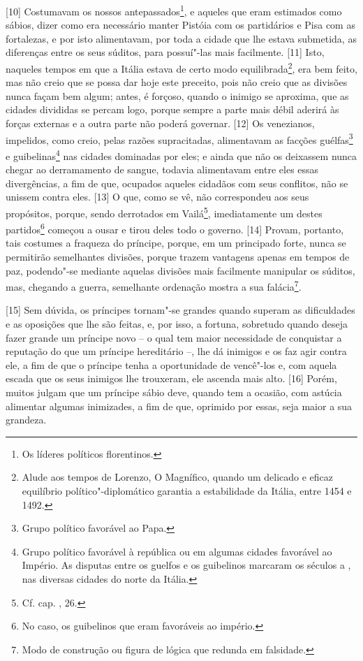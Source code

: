 {[}10{]} Costumavam os nossos antepassados\footnote{Os líderes políticos
  florentinos.}, e aqueles que eram estimados como sábios, dizer como
era necessário manter Pistóia com os partidários e Pisa com as
fortalezas, e por isto alimentavam, por toda a cidade que lhe estava
submetida, as diferenças entre os seus súditos, para possuí"-las mais
facilmente. {[}11{]} Isto, naqueles tempos em que a Itália estava de
certo modo equilibrada\footnote{Alude aos tempos de Lorenzo, O
  Magnífico, quando um delicado e eficaz equilíbrio político"-diplomático garantia a estabilidade da Itália, entre 1454 e 1492.},
era bem feito, mas não creio que se possa dar hoje este preceito, pois
não creio que as divisões nunca façam bem algum; antes, é forçoso,
quando o inimigo se aproxima, que as cidades divididas se percam logo,
porque sempre a parte mais débil aderirá às forças externas e a outra
parte não poderá governar. {[}12{]} Os venezianos, impelidos, como
creio, pelas razões supracitadas, alimentavam as facções
guélfas\footnote{Grupo político favorável ao Papa.} e
guibelinas\footnote{Grupo político favorável à república ou em algumas
  cidades favorável ao Império. As disputas entre os guelfos e os
  guibelinos marcaram os séculos  a , nas diversas cidades do
  norte da Itália.} nas cidades dominadas por eles; e ainda que não os
deixassem nunca chegar ao derramamento de sangue, todavia alimentavam
entre eles essas divergências, a fim de que, ocupados aqueles cidadãos
com seus conflitos, não se unissem contra eles. {[}13{]} O que, como se
vê, não correspondeu aos seus propósitos, porque, sendo derrotados em
Vailá\footnote{Cf. cap. , 26.}, imediatamente um destes
partidos\footnote{No caso, os guibelinos que eram favoráveis ao império.}
começou a ousar e tirou deles todo o governo. {[}14{]} Provam, portanto,
tais costumes a fraqueza do príncipe, porque, em um principado forte,
nunca se permitirão semelhantes divisões, porque trazem vantagens apenas
em tempos de paz, podendo"-se mediante aquelas divisões mais facilmente
manipular os súditos, mas, chegando a guerra, semelhante ordenação
mostra a sua falácia\footnote{Modo de construção ou figura de lógica que
  redunda em falsidade.}.

{[}15{]} Sem dúvida, os príncipes tornam"-se grandes quando superam as
dificuldades e as oposições que lhe são feitas, e, por isso, a fortuna,
sobretudo quando deseja fazer grande um príncipe novo -- o qual tem
maior necessidade de conquistar a reputação do que um príncipe
hereditário --, lhe dá inimigos e os faz agir contra ele, a fim de que o
príncipe tenha a oportunidade de vencê"-los e, com aquela escada que os
seus inimigos lhe trouxeram, ele ascenda mais alto. {[}16{]} Porém,
muitos julgam que um príncipe sábio deve, quando tem a ocasião, com
astúcia alimentar algumas inimizades, a fim de que, oprimido por essas,
seja maior a sua grandeza.

